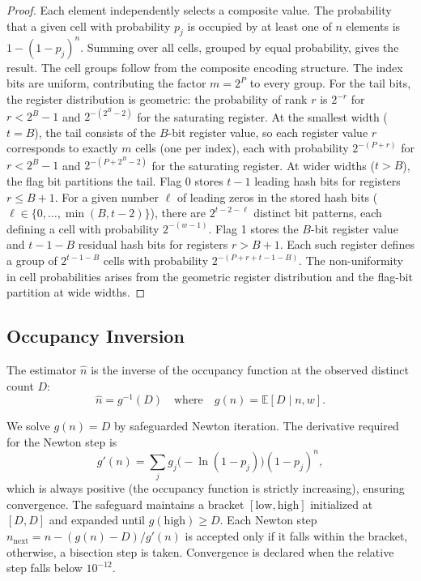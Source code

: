 \documentclass[11pt,letterpaper]{article}
\begin{document}
\begin{proof}
Each element independently selects a composite value. The probability
that a given cell with probability $p_j$ is occupied by at least one
of $n$ elements is $1 - (1 - p_j)^n$. Summing over all cells, grouped
by equal probability, gives the result. The cell groups follow from
the composite encoding structure. The index bits are uniform,
contributing the factor $m = 2^P$ to every group. For the tail bits,
the register distribution is geometric: the probability of rank $r$
is $2^{-r}$ for $r < 2^B - 1$ and $2^{-(2^B-2)}$ for the saturating
register. At the smallest width ($t = B$), the tail consists of the
$B$-bit register value, so each register value $r$ corresponds to
exactly $m$ cells (one per index), each with probability
$2^{-(P+r)}$ for $r < 2^B - 1$ and $2^{-(P+2^B-2)}$ for the saturating
register. At wider widths ($t > B$), the flag bit partitions the
tail. Flag 0 stores $t - 1$ leading hash bits for registers
$r \leq B + 1$. For a given number $\ell$ of leading zeros in the
stored hash bits ($\ell \in \{0, \dots, \min(B, t - 2)\}$), there are
$2^{t - 2 - \ell}$ distinct bit patterns, each defining a cell with
probability $2^{-(w - 1)}$. Flag 1 stores the $B$-bit register value
and $t - 1 - B$ residual hash bits for registers $r > B + 1$. Each
such register defines a group of $2^{t - 1 - B}$ cells with
probability $2^{-(P + r + t - 1 - B)}$. The non-uniformity in cell
probabilities arises from the geometric register distribution and the
flag-bit partition at wide widths.
\end{proof}

\subsection{Occupancy Inversion}

The estimator $\hat{n}$ is the inverse of the occupancy function at the
observed distinct count $D$:
\begin{equation}
  \hat{n} = g^{-1}(D) \quad \text{where} \quad g(n) = \mathbb{E}[D \mid n, w].
  \label{eq:inverse}
\end{equation}

We solve $g(n) = D$ by safeguarded Newton iteration. The derivative
required for the Newton step is
\begin{equation}
  g'(n) = \sum_{j} g_j \bigl(-\ln(1 - p_j)\bigr) (1 - p_j)^n,
  \label{eq:deriv}
\end{equation}
which is always positive (the occupancy function is strictly
increasing), ensuring convergence. The safeguard maintains a bracket
$[\text{low}, \text{high}]$ initialized at $[D, D]$ and expanded until
$g(\text{high}) \geq D$. Each Newton step $n_{\text{next}} = n -
(g(n) - D) / g'(n)$ is accepted only if it falls within the bracket,
otherwise, a bisection step is taken. Convergence is declared when the
relative step falls below $10^{-12}$.
\end{document}
